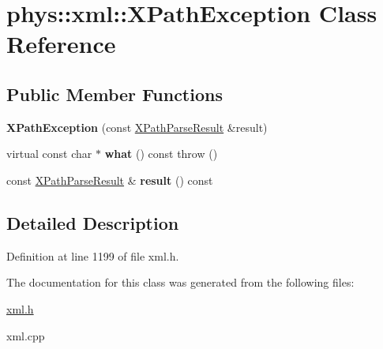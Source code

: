 \hypertarget{classphys_1_1xml_1_1XPathException}{
\section{phys::xml::XPathException Class Reference}
\label{d4/d30/classphys_1_1xml_1_1XPathException}
}
\subsection*{Public Member Functions}
\begin{DoxyCompactItemize}
\item 
\hypertarget{classphys_1_1xml_1_1XPathException_a2c326bac98d78d0816310bfac6c3b68f}{
{\bfseries XPathException} (const \hyperlink{structphys_1_1xml_1_1XPathParseResult}{XPathParseResult} \&result)}
\label{d4/d30/classphys_1_1xml_1_1XPathException_a2c326bac98d78d0816310bfac6c3b68f}

\item 
\hypertarget{classphys_1_1xml_1_1XPathException_a36e9d9daa5c8e2680057b2e1642ed225}{
virtual const char $\ast$ {\bfseries what} () const   throw ()}
\label{d4/d30/classphys_1_1xml_1_1XPathException_a36e9d9daa5c8e2680057b2e1642ed225}

\item 
\hypertarget{classphys_1_1xml_1_1XPathException_a37af29b6a83c06c8f2bf89eace7704fd}{
const \hyperlink{structphys_1_1xml_1_1XPathParseResult}{XPathParseResult} \& {\bfseries result} () const }
\label{d4/d30/classphys_1_1xml_1_1XPathException_a37af29b6a83c06c8f2bf89eace7704fd}

\end{DoxyCompactItemize}


\subsection{Detailed Description}


Definition at line 1199 of file xml.h.



The documentation for this class was generated from the following files:\begin{DoxyCompactItemize}
\item 
\hyperlink{xml_8h}{xml.h}\item 
xml.cpp\end{DoxyCompactItemize}
